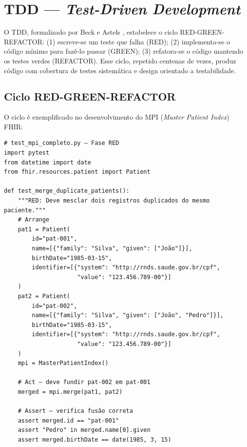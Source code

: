 \section{TDD --- \textit{Test-Driven Development}}

O TDD, formalizado por Beck \cite{beck2003tdd} e Astels \cite{astels2003testdriven}, estabelece o ciclo RED-GREEN-REFACTOR: (1) escreve-se um teste que falha (RED); (2) implementa-se o código mínimo para fazê-lo passar (GREEN); (3) refatora-se o código mantendo os testes verdes (REFACTOR). Esse ciclo, repetido centenas de vezes, produz código com cobertura de testes sistemática e design orientado a testabilidade.

\subsection{Ciclo RED-GREEN-REFACTOR}

O ciclo é exemplificado no desenvolvimento do MPI (\textit{Master Patient Index}) FHIR:

\begin{lstlisting}[style=pythonstyle, caption=Ciclo RED: teste que falha para merge de pacientes, label=code:tdd_red]
# test_mpi_completo.py — Fase RED
import pytest
from datetime import date
from fhir.resources.patient import Patient

def test_merge_duplicate_patients():
    """RED: Deve mesclar dois registros duplicados do mesmo paciente."""
    # Arrange
    pat1 = Patient(
        id="pat-001",
        name=[{"family": "Silva", "given": ["João"]}],
        birthDate="1985-03-15",
        identifier=[{"system": "http://rnds.saude.gov.br/cpf", 
                     "value": "123.456.789-00"}]
    )
    pat2 = Patient(
        id="pat-002",
        name=[{"family": "Silva", "given": ["João", "Pedro"]}],
        birthDate="1985-03-15",
        identifier=[{"system": "http://rnds.saude.gov.br/cpf",
                     "value": "123.456.789-00"}]
    )
    mpi = MasterPatientIndex()
    
    # Act — deve fundir pat-002 em pat-001
    merged = mpi.merge(pat1, pat2)
    
    # Assert — verifica fusão correta
    assert merged.id == "pat-001"
    assert "Pedro" in merged.name[0].given
    assert merged.birthDate == date(1985, 3, 15)
\end{lstlisting}

